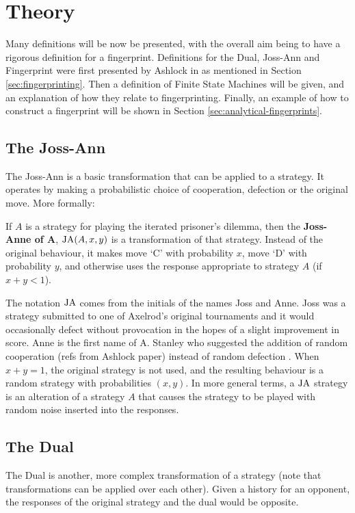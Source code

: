 
\chapter{Theory}\label{cha:theory}

Many definitions will be now be presented, with the overall aim being to have a rigorous definition for a fingerprint.
Definitions for the Dual, Joss-Ann and Fingerprint were first presented by Ashlock in \cite{Ashlock2004} as mentioned in Section \ref{sec:fingerprinting}.
Then a definition of Finite State Machines will be given, and an explanation of how they relate to fingerprinting.
Finally, an example of how to construct a fingerprint will be shown in Section \ref{sec:analytical-fingerprints}.

\section{The Joss-Ann}
The Joss-Ann is a basic transformation that can be applied to a strategy.
It operates by making a probabilistic choice of cooperation, defection or the original move.
More formally:

\begin{definition}\label{def:joss-ann}
If $A$ is a strategy for playing the iterated prisoner's dilemma, then the \textbf{Joss-Anne of A}, $\text{JA}(A, x, y)$ is a transformation of that strategy.
Instead of the original behaviour, it makes move `C' with probability $x$, move `D' with probability $y$, and otherwise uses the response appropriate to strategy $A$ (if $x+y < 1$).
\end{definition}

The notation $\text{JA}$ comes from the initials of the names Joss and Anne.
Joss was a strategy submitted to one of Axelrod’s original tournaments and it would occasionally defect without provocation in the hopes of a slight improvement in score.
Anne is the first name of A. Stanley who suggested the addition of random cooperation (refs from Ashlock paper) instead of random defection \cite{Ashlock2008}. %
When $x + y = 1$, the original strategy is not used, and the resulting behaviour is a random strategy with probabilities $(x, y)$.
In more general terms, a $\text{JA}$ strategy is an alteration of a strategy $A$ that causes the strategy to be played with random noise inserted into the responses.

\section{The Dual}
The Dual is another, more complex transformation of a strategy (note that transformations can be applied over each other).
Given a history for an opponent, the responses of the original strategy and the dual would be opposite.

